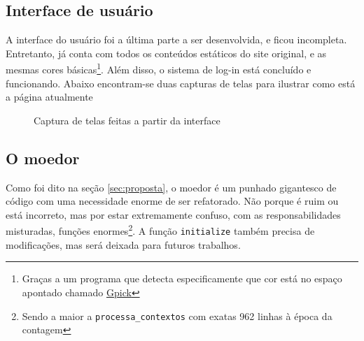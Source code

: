 \subsection{Interface de usuário}\label{subsec:gui}

A interface do usuário foi a última parte a ser desenvolvida, e ficou incompleta. Entretanto, já conta com todos os
conteúdos estáticos do site original, e as mesmas cores básicas\footnote{Graças a um programa que detecta especificamente
que cor está no espaço apontado chamado \href{http://www.gpick.org/}{Gpick}}. Além disso, o sistema de log-in está
concluído e funcionando. Abaixo encontram-se duas capturas de telas para
ilustrar como está a página atualmente

\begin{figure}[htb]
  \centering
  \caption{Captura de telas feitas a partir da interface}
  \label{fig:screenshots}
\end{figure}

\subsection{O moedor}\label{subsec:o-moedor}

Como foi dito na seção \ref{sec:proposta}, o moedor é um punhado gigantesco de código com uma necessidade enorme de
ser refatorado. Não porque é ruim ou está incorreto, mas por estar extremamente confuso, com as responsabilidades
misturadas, funções enormes\footnote{Sendo a maior a \texttt{processa\_contextos} com exatas 962 linhas à época da
contagem}. A função \texttt{initialize} também precisa de modificações, mas será deixada para futuros trabalhos.

